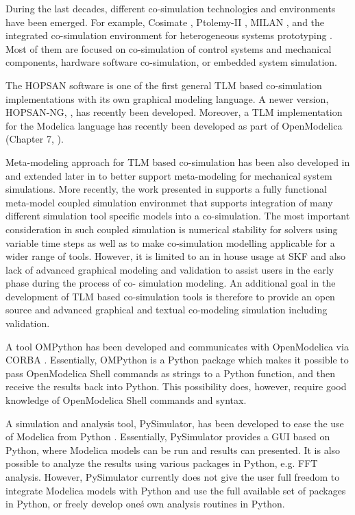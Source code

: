 During the last decades, different co-simulation technologies and environments have been emerged.  For example, Cosimate \cite{tnisoftware}, Ptolemy-II \cite{cosimulationptolemy}, MILAN \cite{cosimulationmilan}, and the integrated co-simulation environment for heterogeneous systems prototyping \cite{cosimulationyongjoo}. Most of them are focused on co-simulation of control systems and mechanical components, hardware software co-simulation, or embedded system simulation. 

The HOPSAN \cite{hopsanusersguide} software is one of the first general TLM based co-simulation implementations with its own graphical modeling language. A newer version, HOPSAN-NG, \cite{hospanaxin}, has recently been developed. Moreover, a TLM implementation for the Modelica language has recently been developed as part of OpenModelica (Chapter 7, \cite{tlmmartin}).

Meta-modeling approach for TLM based co-simulation has been also developed in \cite{tlmalexander05} and extended later in \cite{tlmsiemers06,tlmsiemers07} to better support meta-modeling for mechanical system simulations. More recently, the work presented in \cite{tlmsiemers09} supports a fully functional meta-model coupled simulation environmet that supports integration of many different simulation tool specific models into a co-simulation. The most important consideration in such coupled simulation is numerical stability for solvers using variable time steps as well as to make co-simulation modelling applicable for a wider range of tools. However, it is limited to an in house usage at SKF and also lack of advanced graphical modeling and validation to assist users in the early phase during the process of co- simulation modeling. An additional goal in the development of TLM based co-simulation tools is therefore to provide an open source and advanced graphical and textual co-modeling simulation including validation.

A tool OMPython has been developed and communicates with OpenModelica via CORBA \cite{ompythonanandthesis}. Essentially, OMPython is a Python package which makes it possible to pass OpenModelica Shell commands as strings to a Python function, and then receive the results back into Python. This possibility does, however, require good knowledge of OpenModelica Shell commands and syntax. 

A simulation and analysis tool, PySimulator, has been developed to ease the use of Modelica from Python \cite{pysimulator}. Essentially, PySimulator provides a GUI based on Python, where Modelica models can be run and results can presented. It is also possible to analyze the results using various packages in Python, e.g. FFT analysis. However, PySimulator currently does not give the user full freedom to integrate Modelica models with Python and use the full available set of packages in Python, or freely develop one\'s own analysis routines in Python.


